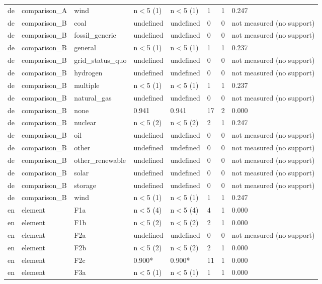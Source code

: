 \begin{table}[htbp]
\begin{tabular}{llllllll}
de & comparison\_A & wind & n$<$5 (1) & n$<$5 (1) & 1 & 1 & 0.247 \\
de & comparison\_B & coal & undefined & undefined & 0 & 0 & not measured (no support) \\
de & comparison\_B & fossil\_generic & undefined & undefined & 0 & 0 & not measured (no support) \\
de & comparison\_B & general & n$<$5 (1) & n$<$5 (1) & 1 & 1 & 0.237 \\
de & comparison\_B & grid\_status\_quo & undefined & undefined & 0 & 0 & not measured (no support) \\
de & comparison\_B & hydrogen & undefined & undefined & 0 & 0 & not measured (no support) \\
de & comparison\_B & multiple & n$<$5 (1) & n$<$5 (1) & 1 & 1 & 0.237 \\
de & comparison\_B & natural\_gas & undefined & undefined & 0 & 0 & not measured (no support) \\
de & comparison\_B & none & 0.941 & 0.941 & 17 & 2 & 0.000 \\
de & comparison\_B & nuclear & n$<$5 (2) & n$<$5 (2) & 2 & 1 & 0.247 \\
de & comparison\_B & oil & undefined & undefined & 0 & 0 & not measured (no support) \\
de & comparison\_B & other & undefined & undefined & 0 & 0 & not measured (no support) \\
de & comparison\_B & other\_renewable & undefined & undefined & 0 & 0 & not measured (no support) \\
de & comparison\_B & solar & undefined & undefined & 0 & 0 & not measured (no support) \\
de & comparison\_B & storage & undefined & undefined & 0 & 0 & not measured (no support) \\
de & comparison\_B & wind & n$<$5 (1) & n$<$5 (1) & 1 & 1 & 0.247 \\
en & element & F1a & n$<$5 (4) & n$<$5 (4) & 4 & 1 & 0.000 \\
en & element & F1b & n$<$5 (2) & n$<$5 (2) & 2 & 1 & 0.000 \\
en & element & F2a & undefined & undefined & 0 & 0 & not measured (no support) \\
en & element & F2b & n$<$5 (2) & n$<$5 (2) & 2 & 1 & 0.000 \\
en & element & F2c & 0.900* & 0.900* & 11 & 1 & 0.000 \\
en & element & F3a & n$<$5 (1) & n$<$5 (1) & 1 & 1 & 0.000 \\

\end{tabular}
\end{table}

